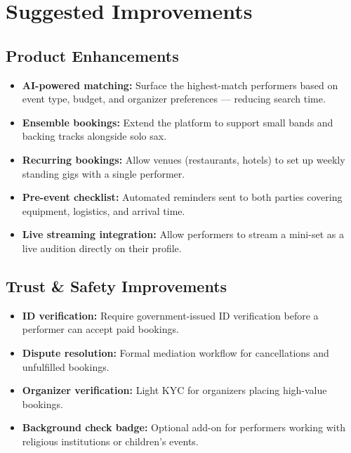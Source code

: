 \documentclass[11pt,a4paper]{article}
\begin{document}
\section{Suggested Improvements}

\subsection{Product Enhancements}
\begin{itemize}[leftmargin=1.5em]
  \item \textbf{AI-powered matching:} Surface the highest-match performers based
        on event type, budget, and organizer preferences --- reducing search
        time.
  \item \textbf{Ensemble bookings:} Extend the platform to support small bands
        and backing tracks alongside solo sax.
  \item \textbf{Recurring bookings:} Allow venues (restaurants, hotels) to set
        up weekly standing gigs with a single performer.
  \item \textbf{Pre-event checklist:} Automated reminders sent to both parties
        covering equipment, logistics, and arrival time.
  \item \textbf{Live streaming integration:} Allow performers to stream a
        mini-set as a live audition directly on their profile.
\end{itemize}

\subsection{Trust \& Safety Improvements}
\begin{itemize}[leftmargin=1.5em]
  \item \textbf{ID verification:} Require government-issued ID verification
        before a performer can accept paid bookings.
  \item \textbf{Dispute resolution:} Formal mediation workflow for cancellations
        and unfulfilled bookings.
  \item \textbf{Organizer verification:} Light KYC for organizers placing
        high-value bookings.
  \item \textbf{Background check badge:} Optional add-on for performers working
        with religious institutions or children's events.
\end{itemize}
\end{document}
